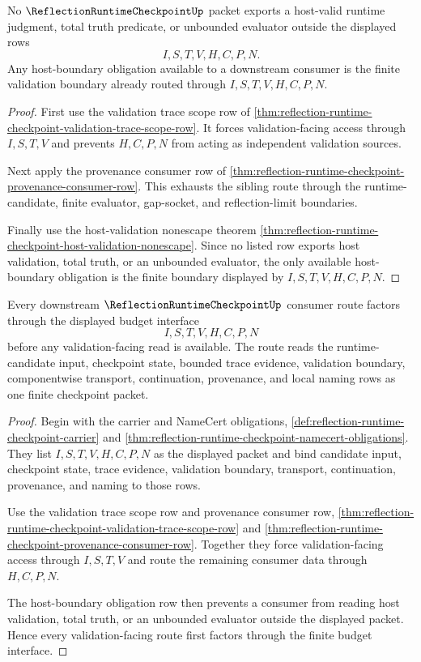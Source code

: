 \begin{theorem}
\label{thm:reflection-runtime-checkpoint-host-boundary-obligation-row}
No $\ReflectionRuntimeCheckpointUp$ packet exports a host-valid runtime judgment, total truth predicate, or unbounded evaluator outside the displayed rows
$$
I,S,T,V,H,C,P,N.
$$
Any host-boundary obligation available to a downstream consumer is the finite validation boundary already routed through $I,S,T,V,H,C,P,N$.
\end{theorem}
\begin{proof}
First use the validation trace scope row of \autoref{thm:reflection-runtime-checkpoint-validation-trace-scope-row}. It forces validation-facing access through $I,S,T,V$ and prevents $H,C,P,N$ from acting as independent validation sources.

Next apply the provenance consumer row of \autoref{thm:reflection-runtime-checkpoint-provenance-consumer-row}. This exhausts the sibling route through the runtime-candidate, finite evaluator, gap-socket, and reflection-limit boundaries.

Finally use the host-validation nonescape theorem \autoref{thm:reflection-runtime-checkpoint-host-validation-nonescape}. Since no listed row exports host validation, total truth, or an unbounded evaluator, the only available host-boundary obligation is the finite boundary displayed by $I,S,T,V,H,C,P,N$.
\end{proof}

\begin{theorem}
\label{thm:reflection-runtime-checkpoint-route-budget-interface}
Every downstream $\ReflectionRuntimeCheckpointUp$ consumer route factors through the displayed budget interface
$$
I,S,T,V,H,C,P,N
$$
before any validation-facing read is available. The route reads the runtime-candidate input, checkpoint state, bounded trace evidence, validation boundary, componentwise transport, continuation, provenance, and local naming rows as one finite checkpoint packet.
\end{theorem}
\begin{proof}
Begin with the carrier and NameCert obligations, \autoref{def:reflection-runtime-checkpoint-carrier} and \autoref{thm:reflection-runtime-checkpoint-namecert-obligations}. They list $I,S,T,V,H,C,P,N$ as the displayed packet and bind candidate input, checkpoint state, trace evidence, validation boundary, transport, continuation, provenance, and naming to those rows.

Use the validation trace scope row and provenance consumer row, \autoref{thm:reflection-runtime-checkpoint-validation-trace-scope-row} and \autoref{thm:reflection-runtime-checkpoint-provenance-consumer-row}. Together they force validation-facing access through $I,S,T,V$ and route the remaining consumer data through $H,C,P,N$.

The host-boundary obligation row then prevents a consumer from reading host validation, total truth, or an unbounded evaluator outside the displayed packet. Hence every validation-facing route first factors through the finite budget interface.
\end{proof}

